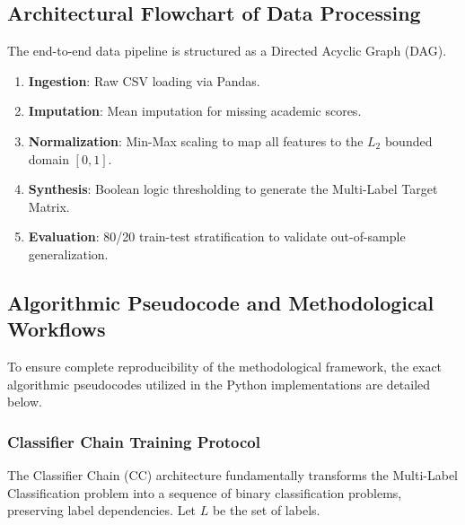 \subsection{Architectural Flowchart of Data Processing}
The end-to-end data pipeline is structured as a Directed Acyclic Graph (DAG). 
\begin{enumerate}
    \item \textbf{Ingestion}: Raw CSV loading via Pandas.
    \item \textbf{Imputation}: Mean imputation for missing academic scores.
    \item \textbf{Normalization}: Min-Max scaling to map all features to the $L_2$ bounded domain $[0, 1]$.
    \item \textbf{Synthesis}: Boolean logic thresholding to generate the Multi-Label \parencite{tsoumakas2007multi} Target Matrix.
    \item \textbf{Evaluation}: 80/20 train-test stratification to validate out-of-sample generalization.
\end{enumerate}





\subsection{Algorithmic Pseudocode and Methodological Workflows}

To ensure complete reproducibility of the methodological framework, the exact algorithmic pseudocodes utilized in the Python implementations are detailed below.

\subsubsection{Classifier Chain Training Protocol}
The Classifier Chain \parencite{read2011classifier} (CC) architecture fundamentally transforms the Multi-Label \parencite{tsoumakas2007multi} Classification problem into a sequence of binary classification problems, preserving label dependencies. Let $L$ be the set of labels.

